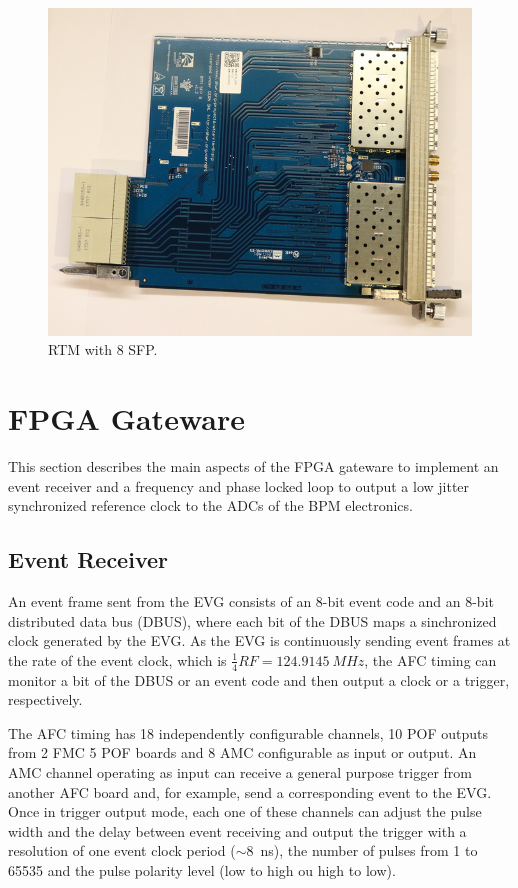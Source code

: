 \documentclass[a4paper,
               biblatex,      %
               ]{jacow}
\begin{document}
\begin{figure}[!htb]
   \centering
   \includegraphics*[width=0.8\columnwidth]{RTM_SFP_resized}
   \caption{RTM with 8 SFP.}
   \label{fig:rtm_sfp}
\end{figure}

\section{FPGA Gateware}

This section describes the main aspects of the FPGA gateware to implement an event receiver and a frequency and phase locked loop to output a low jitter synchronized reference clock to the ADCs of the BPM electronics.

\subsection{Event Receiver}

An event frame sent from the EVG consists of an 8-bit event code and an 8-bit distributed data bus (DBUS), where each bit of the DBUS maps a sinchronized clock generated by the EVG.
As the EVG is continuously sending event frames at the rate of the event clock, which is $\frac{1}{4}RF=124.9145~MHz$, the AFC timing can monitor a bit of the DBUS or an event code and then output a clock or a trigger, respectively. 

The AFC timing has 18 independently configurable channels, 10 POF outputs from 2 FMC 5 POF boards and 8 AMC configurable as input or output. An AMC channel operating as input can receive a general purpose trigger from another AFC board and, for example, send a corresponding event to the EVG. Once in trigger output mode, each one of these channels can adjust the pulse width and the delay between event receiving and output the trigger with a resolution of one event clock period ($\sim$8~ns), the number of pulses from 1 to 65535 and the pulse polarity level (low to high ou high to low).  
\end{document}
